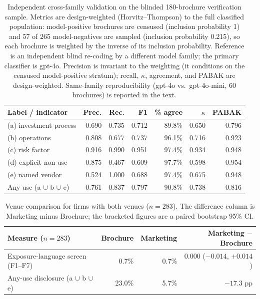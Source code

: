 \documentclass[utf8]{FrontiersinHarvard}
\begin{document}
\begin{table}[h!]
\caption{Independent cross-family validation on the blinded 180-brochure verification sample. Metrics are design-weighted (Horvitz--Thompson) to the full classified population: model-positive brochures are censused (inclusion probability 1) and 57 of 265 model-negatives are sampled (inclusion probability 0.215), so each brochure is weighted by the inverse of its inclusion probability. Reference is an independent blind re-coding by a different model family; the primary classifier is gpt-4o. Precision is invariant to the weighting (it conditions on the censused model-positive stratum); recall, $\kappa$, agreement, and PABAK are design-weighted. Same-family reproducibility (gpt-4o vs.\ gpt-4o-mini, 60 brochures) is reported in the text.}
\label{tab:validation}
\centering
\small
\begin{tabular}{lrrrrrr}
\toprule
Label / indicator & Prec. & Rec. & F1 & \% agree & $\kappa$ & PABAK \\
\midrule
(a) investment process & 0.690 & 0.735 & 0.712 & 89.8\% & 0.650 & 0.796 \\
(b) operations & 0.808 & 0.677 & 0.737 & 96.1\% & 0.716 & 0.923 \\
(c) risk factor & 0.916 & 0.990 & 0.951 & 97.4\% & 0.934 & 0.948 \\
(d) explicit non-use & 0.875 & 0.467 & 0.609 & 97.7\% & 0.598 & 0.954 \\
(e) named vendor & 0.524 & 1.000 & 0.688 & 97.4\% & 0.675 & 0.948 \\
Any use (a $\cup$ b $\cup$ e) & 0.761 & 0.837 & 0.797 & 90.8\% & 0.738 & 0.816 \\
\bottomrule
\end{tabular}
\end{table}

\begin{table}[h!]
\caption{Venue comparison for firms with both venues ($n = 283$). The difference column is Marketing minus Brochure; the bracketed figures are a paired bootstrap 95\% CI.}
\label{tab:venue}
\centering
\begin{tabular}{lrrr}
\toprule
Measure ($n = 283$) & Brochure & Marketing & Marketing $-$ Brochure \\
\midrule
Exposure-language screen (F1--F7) & 0.7\% & 0.7\% & 0.000 ($-0.014$, $+0.014$) \\
Any-use disclosure (a $\cup$ b $\cup$ e) & 23.0\% & 5.7\% & $-17.3$ pp \\
\bottomrule
\end{tabular}
\end{table}
\end{document}
